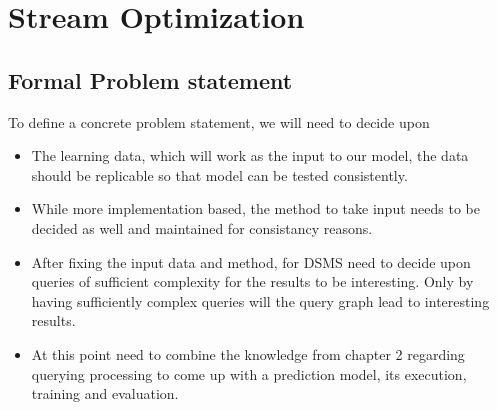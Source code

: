 \chapter{Stream Optimization}
\label{chapter:stream_optimization}
\thispagestyle{myheadings}

\graphicspath{{3_Conclusion/Figures/}}

\section{Formal Problem statement}
To define a concrete problem statement, we will need to decide upon
\begin{itemize}
    \item The learning data, which will work as the input to our model, the data should be replicable so that model can be tested consistently.
    \item While more implementation based, the method to take input needs to be decided as well and maintained for consistancy reasons.
    \item After fixing the input data and method, for DSMS need to decide upon queries of sufficient complexity for the results to be interesting. 
    Only by having sufficiently complex queries will the query graph lead to interesting results.
    \item At this point need to combine the knowledge from chapter 2 regarding querying processing to come up with a prediction model, its execution, training and evaluation.

\end{itemize}

% 

